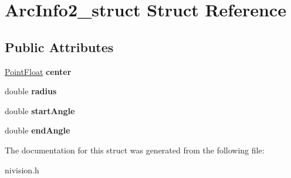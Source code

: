 \hypertarget{structArcInfo2__struct}{
\section{ArcInfo2\_\-struct Struct Reference}
\label{structArcInfo2__struct}
}
\subsection*{Public Attributes}
\begin{DoxyCompactItemize}
\item 
\hypertarget{structArcInfo2__struct_a79887a50ef8d0c95d01acdfbeb68bd0c}{
\hyperlink{structPointFloat__struct}{PointFloat} {\bfseries center}}
\label{structArcInfo2__struct_a79887a50ef8d0c95d01acdfbeb68bd0c}

\item 
\hypertarget{structArcInfo2__struct_ac6c9a6321d2b87742a0c6fe247e1a413}{
double {\bfseries radius}}
\label{structArcInfo2__struct_ac6c9a6321d2b87742a0c6fe247e1a413}

\item 
\hypertarget{structArcInfo2__struct_a94f6cf252ed4af96cbb75d609bac1be3}{
double {\bfseries startAngle}}
\label{structArcInfo2__struct_a94f6cf252ed4af96cbb75d609bac1be3}

\item 
\hypertarget{structArcInfo2__struct_ae5e66e315b5567390899bc7846fccae9}{
double {\bfseries endAngle}}
\label{structArcInfo2__struct_ae5e66e315b5567390899bc7846fccae9}

\end{DoxyCompactItemize}


The documentation for this struct was generated from the following file:\begin{DoxyCompactItemize}
\item 
nivision.h\end{DoxyCompactItemize}
